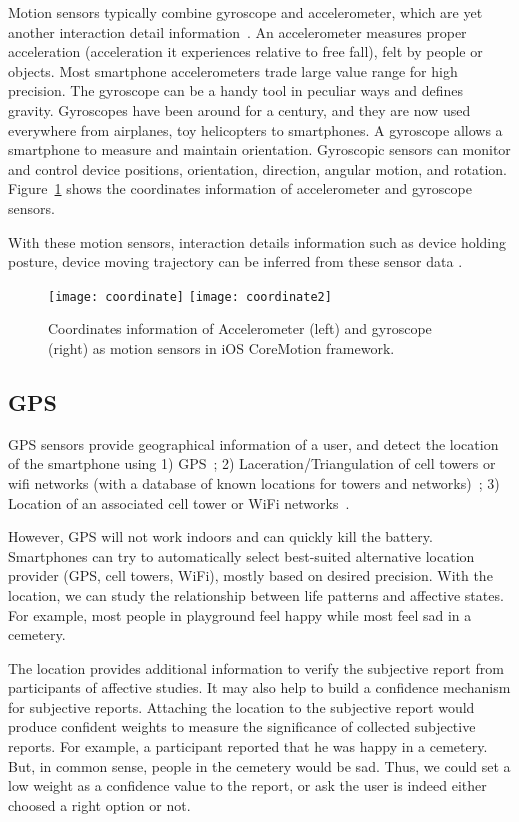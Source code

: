 Motion sensors typically combine gyroscope and accelerometer, which are yet another interaction detail information~\cite{Zhang2014}. An accelerometer measures proper acceleration (acceleration it experiences relative to free fall), felt by people or objects. Most smartphone accelerometers trade large value range for high precision. The gyroscope can be a handy tool in peculiar ways and defines gravity. Gyroscopes have been around for a century, and they are now used everywhere from airplanes, toy helicopters to smartphones. A gyroscope allows a smartphone to measure and maintain orientation. Gyroscopic sensors can monitor and control device positions, orientation, direction, angular motion, and rotation. Figure~\ref{fig:motion} shows the coordinates information of accelerometer and gyroscope sensors.

With these motion sensors, interaction details information such as device holding posture, device moving trajectory can be inferred from these sensor data \cite{Mottelson2016, Poria2017}.

\begin{figure}
    \centering
    \texttt{[image: coordinate]}
    \texttt{[image: coordinate2]}
    \caption{Coordinates information of Accelerometer (left) and gyroscope (right) as motion sensors in iOS CoreMotion framework.}
    \label{fig:motion}
\end{figure}

\subsection{GPS}\label{subsec:gps}

GPS sensors provide geographical information of a user, and detect the location of the smartphone using 1) GPS~\cite{tan2013connectivity}; 2) Laceration/Triangulation of cell towers or wifi networks (with a database of known locations for towers and networks)~\cite{rana2015opportunistic}; 3) Location of an associated cell tower or WiFi networks~\cite{Politou2017}.

However, GPS will not work indoors and can quickly kill the battery. Smartphones can try to automatically select best-suited alternative location provider (GPS, cell towers, WiFi), mostly based on desired precision. With the location, we can study the relationship between life patterns and affective states. For example, most people in playground feel happy while most feel sad in a cemetery.

The location provides additional information to verify the subjective report from participants of affective studies. It may also help to build a confidence mechanism \cite{tan2013connectivity} for subjective reports. Attaching the location to the subjective report would produce confident weights to measure the significance of collected subjective reports. For example, a participant reported that he was happy in a cemetery. But, in common sense, people in the cemetery would be sad. Thus, we could set a low weight as a confidence value to the report, or ask the user is indeed either choosed a right option or not.

